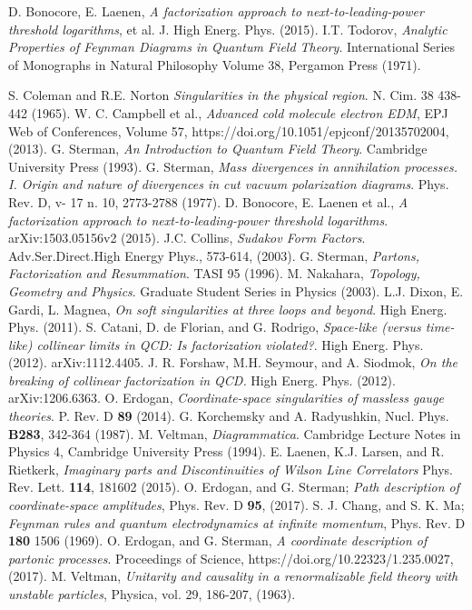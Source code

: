 \documentclass[%
 reprint,
 amsmath,amssymb,
 aps,
]{revtex4-1}
\begin{document}
\begin{thebibliography}{21}
D. Bonocore, E. Laenen, \textit{A factorization approach to next-to-leading-power threshold logarithms}, et al. J. High Energ. Phys. (2015).
I.T. Todorov, \textit{Analytic Properties of Feynman Diagrams in Quantum Field Theory}. International Series of Monographs in Natural Philosophy Volume 38, Pergamon Press (1971).
 
S. Coleman and R.E. Norton \textit{Singularities in the physical region}. N. Cim. 38 438-442 (1965).
W. C. Campbell et al., \textit{Advanced cold molecule electron EDM}, 	
EPJ Web of Conferences, Volume 57, https://doi.org/10.1051/epjconf/20135702004, (2013).
G. Sterman, \textit{An Introduction to Quantum Field Theory}. Cambridge University Press (1993).
G. Sterman, \textit{Mass divergences in annihilation processes. I. Origin and nature of divergences in cut vacuum polarization diagrams}. Phys. Rev. D, v- 17 n. 10, 2773-2788 (1977).
D. Bonocore, E. Laenen et al., \textit{A factorization approach to next-to-leading-power threshold logarithms}.  arXiv:1503.05156v2 (2015).
J.C. Collins, \textit{Sudakov Form Factors}. Adv.Ser.Direct.High Energy Phys., 573-614, (2003).
G. Sterman, \textit{Partons, Factorization and Resummation}. TASI 95 (1996).
M. Nakahara, \textit{Topology, Geometry and Physics}.  Graduate Student Series in Physics (2003).
L.J. Dixon, E. Gardi, L. Magnea, \textit{On soft singularities at three loops and beyond}. High Energ. Phys. (2011).
S. Catani, D. de Florian, and G. Rodrigo, \textit{Space-like (versus time-like) collinear limits in QCD: Is factorization violated?}.  High Energ. Phys. (2012).	arXiv:1112.4405.
J. R. Forshaw, M.H. Seymour, and A. Siodmok, \textit{On the breaking of collinear factorization in QCD.}  High Energ. Phys. (2012). arXiv:1206.6363.
O. Erdogan, \textit{Coordinate-space singularities of massless gauge theories}.  P. Rev. D \textbf{89} (2014).
G. Korchemsky and A. Radyushkin,   Nucl. Phys. \textbf{B283}, 342-364 (1987).
M. Veltman, \textit{Diagrammatica}. Cambridge Lecture Notes in Physics 4, Cambridge University Press (1994).
E. Laenen, K.J. Larsen, and R. Rietkerk, \textit{Imaginary parts and Discontinuities of Wilson Line Correlators}  Phys. Rev. Lett. \textbf{114}, 181602 (2015).
O. Erdogan, and G. Sterman; \textit{Path description of coordinate-space amplitudes}, Phys. Rev. D \textbf{95}, (2017).
S. J. Chang, and S. K. Ma; \textit{Feynman rules and quantum electrodynamics at infinite momentum}, Phys. Rev. D \textbf{180} 1506 (1969).
O. Erdogan, and G. Sterman,  \textit{A coordinate description of partonic processes}. Proceedings of Science,  https://doi.org/10.22323/1.235.0027, (2017).
M. Veltman, \textit{Unitarity and causality in a renormalizable field theory with unstable particles}, Physica, vol. 29, 186-207, (1963).

\end{thebibliography}
\end{document}
